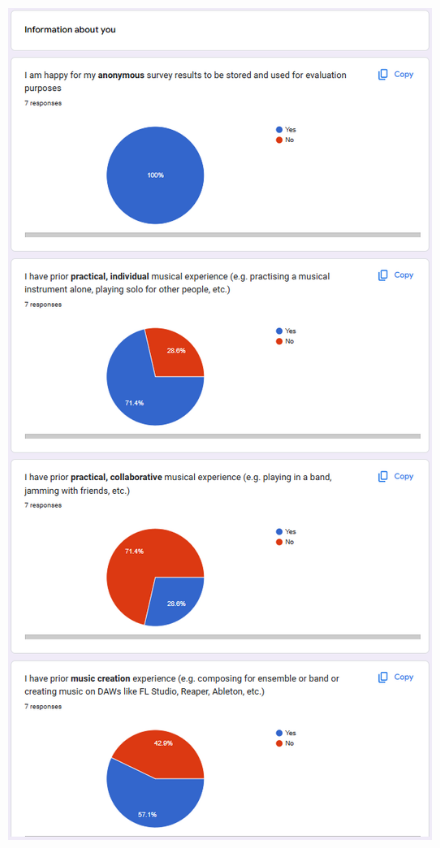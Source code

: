 \begin{appendices}
\begin{figure}[htb]
    \includegraphics[width=0.8\linewidth]{images/survey-results/3.png}    
\end{figure}
\begin{figure}[htb]
    \centering

\end{figure}
\end{appendices}
